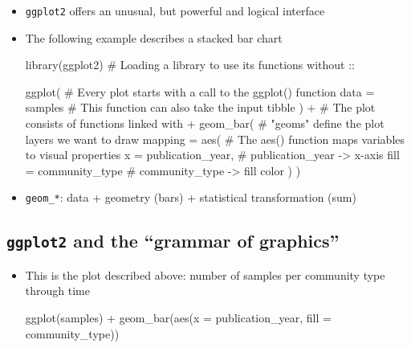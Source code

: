 \documentclass[
  letterpaper,
]{book}
\newenvironment{Shaded}{}{}
\newcommand{\AttributeTok}[1]{\textcolor[rgb]{0.84,0.23,0.29}{#1}}
\newcommand{\CommentTok}[1]{\textcolor[rgb]{0.42,0.45,0.49}{#1}}
\newcommand{\FunctionTok}[1]{\textcolor[rgb]{0.44,0.26,0.76}{#1}}
\newcommand{\NormalTok}[1]{\textcolor[rgb]{0.14,0.16,0.18}{#1}}
\newcommand{\SpecialCharTok}[1]{\textcolor[rgb]{0.00,0.36,0.77}{#1}}
\begin{document}
\begin{itemize}
\item
  \texttt{ggplot2} offers an unusual, but powerful and logical interface
\item
  The following example describes a stacked bar chart

\begin{Shaded}
\begin{Highlighting}[]
\FunctionTok{library}\NormalTok{(ggplot2) }\CommentTok{\# Loading a library to use its functions without ::}

\FunctionTok{ggplot}\NormalTok{(          }\CommentTok{\# Every plot starts with a call to the ggplot() function}
\AttributeTok{data =}\NormalTok{ samples }\CommentTok{\# This function can also take the input tibble}
\NormalTok{) }\SpecialCharTok{+}              \CommentTok{\# The plot consists of functions linked with +}
\FunctionTok{geom\_bar}\NormalTok{(        }\CommentTok{\# "geoms" define the plot layers we want to draw}
\AttributeTok{mapping =} \FunctionTok{aes}\NormalTok{( }\CommentTok{\# The aes() function maps variables to visual properties}
    \AttributeTok{x =}\NormalTok{ publication\_year, }\CommentTok{\# publication\_year {-}\textgreater{} x{-}axis}
    \AttributeTok{fill =}\NormalTok{ community\_type }\CommentTok{\# community\_type {-}\textgreater{} fill color}
\NormalTok{)}
\NormalTok{)}
\end{Highlighting}
\end{Shaded}
\item
  \texttt{geom\_*}: data + geometry (bars) + statistical transformation
  (sum)
\end{itemize}

\hypertarget{ggplot2-and-the-grammar-of-graphics-1}{%
\subsection{\texorpdfstring{\texttt{ggplot2} and the ``grammar of
graphics''}{ggplot2 and the ``grammar of graphics''}}\label{ggplot2-and-the-grammar-of-graphics-1}}

\begin{itemize}
\item
  This is the plot described above: number of samples per community type
  through time

\begin{Shaded}
\begin{Highlighting}[]
\FunctionTok{ggplot}\NormalTok{(samples) }\SpecialCharTok{+}
\FunctionTok{geom\_bar}\NormalTok{(}\FunctionTok{aes}\NormalTok{(}\AttributeTok{x =}\NormalTok{ publication\_year, }\AttributeTok{fill =}\NormalTok{ community\_type))}
\end{Highlighting}
\end{Shaded}
\end{itemize}
\end{document}
